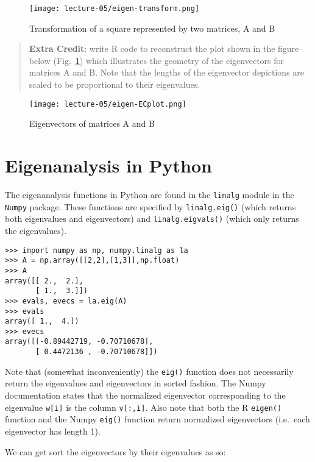\documentclass{article}
\makeatletter
\def\maxwidth{
    \ifdim\Gin@nat@width > 3.5in 
        3.5in
    \else\Gin@nat@width
    \fi}
\let\Oldincludegraphics\includegraphics
\renewcommand{\includegraphics}[1]{\Oldincludegraphics[width=\maxwidth]{#1}}
\makeatother
\begin{document}
\begin{figure}[htbp]
\centering
\texttt{[image: lecture-05/eigen-transform.png]}
\caption{Transformation of a square represented by two matrices, A and
B}
\end{figure}

\begin{quote}
\textbf{Extra Credit}: write R code to reconstruct the plot shown in the
figure below (Fig.~\ref{fig:eigen}) which illustrates the geometry of the eigenvectors for
matrices A and B. Note that the lengths of the eigenvector depictions
are scaled to be proportional to their eigenvalues.

\end{quote}
\begin{figure}[htbp]
\centering
\texttt{[image: lecture-05/eigen-ECplot.png]}
\caption{Eigenvectors of matrices A and B \label{fig:eigen}}
\end{figure}

\section{Eigenanalysis in Python}

The eigenanalysis functions in Python are found in the
\lstinline!linalg! module in the \lstinline!Numpy! package. These
functions are specified by \lstinline!linalg.eig()! (which returns both
eigenvalues and eigenvectors) and \lstinline!linalg.eigvals()! (which
only returns the eigenvalues).

\begin{lstlisting}
>>> import numpy as np, numpy.linalg as la
>>> A = np.array([[2,2],[1,3]],np.float)
>>> A
array([[ 2.,  2.],
       [ 1.,  3.]])
>>> evals, evecs = la.eig(A)
>>> evals
array([ 1.,  4.])
>>> evecs
array([[-0.89442719, -0.70710678],
       [ 0.4472136 , -0.70710678]])
\end{lstlisting}
Note that (somewhat inconveniently) the \lstinline!eig()! function does
not necessarily return the eigenvalues and eigenvectors in sorted
fashion. The Numpy documentation states that the normalized eigenvector
corresponding to the eigenvalue \lstinline!w[i]! is the column
\lstinline!v[:,i]!. Also note that both the R \lstinline!eigen()!
function and the Numpy \lstinline!eig()! function return normalized
eigenvectors (i.e.~each eigenvector has length 1).

We can get sort the eigenvectors by their eigenvalues as so:
\end{document}
